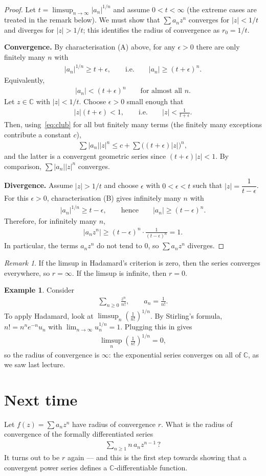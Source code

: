 \documentclass[11pt]{article}
\theoremstyle{plain}
\theoremstyle{definition}
\newtheorem{example}[theorem]{Example}
\theoremstyle{remark}
\newtheorem*{remark}{Remark}
\numberwithin{equation}{section}
\newcommand{\be}{\begin{eqnarray}}
\newcommand{\ee}{\end{eqnarray}}
\newcommand{\C}{\mathbb{C}}
\begin{document}
\begin{proof}
Let $t=\limsup_{n\to\infty}|a_n|^{1/n}$ and assume $0<t<\infty$ (the extreme
cases are treated in the remark below). We must show that $\sum a_nz^n$
converges for $|z|<1/t$ and diverges for $|z|>1/t$; this identifies the
radius of convergence as $r_0=1/t$.

\textbf{Convergence.} By characterisation (A) above, for any $\epsilon>0$
there are only finitely many $n$ with
\be
 |a_n|^{1/n}\ge t+\epsilon,
 \qquad\text{i.e.}\qquad |a_n|\ge(t+\epsilon)^n.
\ee
Equivalently,
\be
\label{eq:club}
 |a_n|<(t+\epsilon)^n\qquad\text{for almost all }n.
\ee
Let $z\in\C$ with $|z|<1/t$. Choose $\epsilon>0$ small enough that
\be
 |z|(t+\epsilon)<1,\qquad\text{i.e.}\qquad |z|<\frac1{t+\epsilon}.
\ee
Then, using~\eqref{eq:club} for all but finitely many terms (the finitely
many exceptions contribute a constant $c$),
\be
 \sum|a_n||z|^n\le c+\sum\bigl((t+\epsilon)|z|\bigr)^n,
\ee
and the latter is a convergent geometric series since
$(t+\epsilon)|z|<1$. By comparison, $\sum|a_n||z|^n$ converges.

\textbf{Divergence.} Assume $|z|>1/t$ and choose $\epsilon$ with
$0<\epsilon<t$ such that $|z|=\dfrac1{t-\epsilon}$.
For this $\epsilon>0$, characterisation (B) gives infinitely many $n$ with
\be
 |a_n|^{1/n}\ge t-\epsilon,\qquad\text{hence}\qquad |a_n|\ge(t-\epsilon)^n.
\ee
Therefore, for infinitely many $n$,
\be
 |a_nz^n|\geq (t-\epsilon)^n\cdot\frac1{(t-\epsilon)^n}=1.
\ee
In particular, the terms $a_nz^n$ do not tend to $0$, so $\sum a_nz^n$
diverges.
\end{proof}

\begin{remark}
If the limsup in Hadamard's criterion is zero, then the series converges
everywhere, so $r=\infty$. If the limsup is infinite, then $r=0$.
\end{remark}

\begin{example}
Consider
\be
 \sum_{n\ge0}\frac{z^n}{n!},\qquad a_n=\frac1{n!}.
\ee
To apply Hadamard, look at $\displaystyle\limsup_n\left(\frac1{n!}\right)^{1/n}$.
By Stirling's formula, $n!=n^ne^{-n}u_n$ with
$\displaystyle\lim_{n\to\infty}u_n^{1/n}=1$. Plugging this in gives
\be
 \limsup_{n}\left(\frac1{n!}\right)^{1/n}=0,
\ee
so the radius of convergence is $\infty$: the exponential series converges
on all of $\C$, as we saw last lecture.
\end{example}

\section*{Next time}
Let $f(z)=\sum a_nz^n$ have radius of convergence $r$. What is the radius of
convergence of the formally differentiated series
\be
 \sum_{n\geq1} n\,a_nz^{n-1}\,?
\ee
It turns out to be $r$ again --- and this is the first step towards showing
that a convergent power series defines a $\C$-differentiable function.
\end{document}
